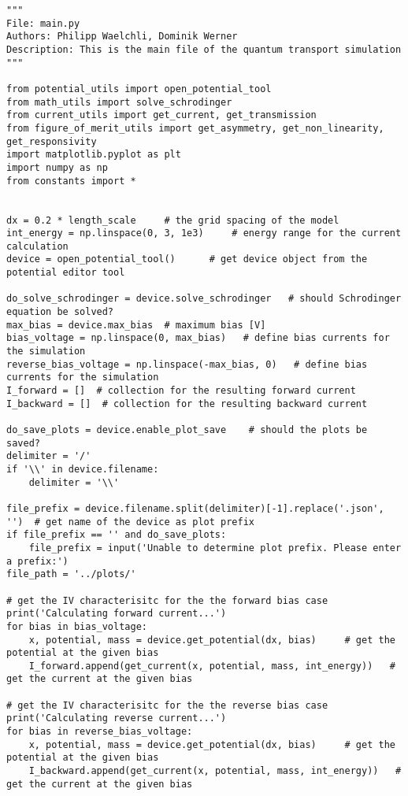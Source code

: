 \begin{lstlisting}
"""
File: main.py
Authors: Philipp Waelchli, Dominik Werner
Description: This is the main file of the quantum transport simulation
"""

from potential_utils import open_potential_tool
from math_utils import solve_schrodinger
from current_utils import get_current, get_transmission
from figure_of_merit_utils import get_asymmetry, get_non_linearity, get_responsivity
import matplotlib.pyplot as plt
import numpy as np
from constants import *


dx = 0.2 * length_scale     # the grid spacing of the model
int_energy = np.linspace(0, 3, 1e3)     # energy range for the current calculation
device = open_potential_tool()      # get device object from the potential editor tool

do_solve_schrodinger = device.solve_schrodinger   # should Schrodinger equation be solved?
max_bias = device.max_bias  # maximum bias [V]
bias_voltage = np.linspace(0, max_bias)   # define bias currents for the simulation
reverse_bias_voltage = np.linspace(-max_bias, 0)   # define bias currents for the simulation
I_forward = []  # collection for the resulting forward current
I_backward = []  # collection for the resulting backward current

do_save_plots = device.enable_plot_save    # should the plots be saved?
delimiter = '/'
if '\\' in device.filename:
    delimiter = '\\'

file_prefix = device.filename.split(delimiter)[-1].replace('.json', '')  # get name of the device as plot prefix
if file_prefix == '' and do_save_plots:
    file_prefix = input('Unable to determine plot prefix. Please enter a prefix:')
file_path = '../plots/'

# get the IV characterisitc for the the forward bias case
print('Calculating forward current...')
for bias in bias_voltage:
    x, potential, mass = device.get_potential(dx, bias)     # get the potential at the given bias
    I_forward.append(get_current(x, potential, mass, int_energy))   # get the current at the given bias

# get the IV characterisitc for the the reverse bias case
print('Calculating reverse current...')
for bias in reverse_bias_voltage:
    x, potential, mass = device.get_potential(dx, bias)     # get the potential at the given bias
    I_backward.append(get_current(x, potential, mass, int_energy))   # get the current at the given bias



\end{lstlisting}
